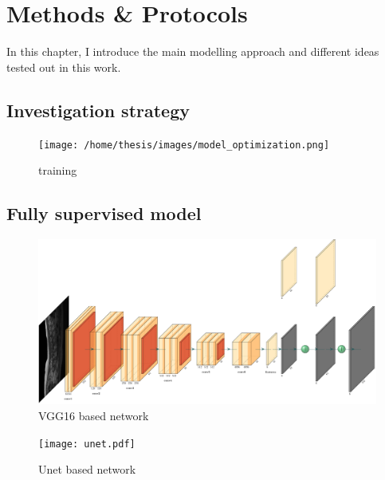\chapter{Methods \& Protocols}

In this chapter, I introduce the main modelling approach and different ideas tested out in this work.


\FloatBarrier




\section{Investigation strategy}

\begin{figure}
    \centering
    \texttt{[image: /home/thesis/images/model\_optimization.png]}
    \caption{training}
\end{figure}

\section{Fully supervised model}







\begin{figure}
    \centering
    \includegraphics[width=.95\textwidth]{vgg16_upscore.pdf}
    \caption{VGG16 based network}
\end{figure}

\begin{figure}
    \centering
    \texttt{[image: unet.pdf]}
    \caption{Unet based network}
\end{figure}


